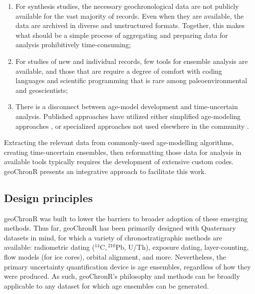 \documentclass[gchron, manuscript]{copernicus}
\begin{document}
\begin{enumerate}
\def\labelenumi{\arabic{enumi}.}
\item
  For synthesis studies, the necessary geochronological data are not publicly available for the vast majority of records. Even when they are available, the data are archived in diverse and unstructured formats. Together, this makes what should be a simple process of aggregating and preparing data for analysis prohibitively time-consuming;
\item
  For studies of new and individual records, few tools for ensemble analysis are available, and those that are require a degree of comfort with coding languages and scientific programming that is rare among paleoenvironmental and geoscientists;
\item
  There is a disconnect between age-model development and time-uncertain analysis. Published approaches have utilized either simplified age-modeling approaches \citep[e.g,][]{Haam_Huybers2010, routson2019mid}, or specialized approaches not used elsewhere in the community \citep[e.g.,][]{Marcott_Science2013, Tierney2013}.
\end{enumerate}

Extracting the relevant data from commonly-used age-modelling algorithms, creating time-uncertain ensembles, then reformatting those data for analysis in available tools typically requires the development of extensive custom codes.
geoChronR presents an integrative approach to facilitate this work.

\subsection{Design principles}

geoChronR was built to lower the barriers to broader adoption of these emerging methods.
Thus far, geoChronR has been primarily designed with Quaternary datasets in mind, for which a variety of chronostratigraphic methods are available: radiometric dating (\({}^{14}\mathrm{C}, {}^{210}\mathrm{Pb}\), U/Th), exposure dating, layer-counting, flow models (for ice cores), orbital alignment, and more.
Nevertheless, the primary uncertainty quantification device is age ensembles, regardless of how they were produced. As such, geoChronR's philosophy and methods can be broadly applicable to any dataset for which age ensembles can be generated.
\end{document}
